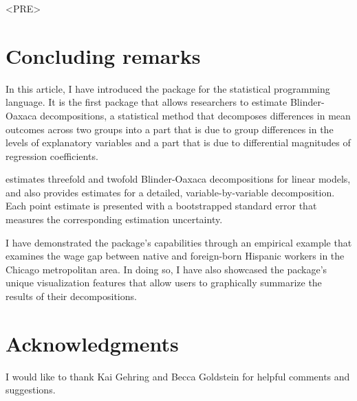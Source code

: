 <PRE>\documentclass[nojss]{jss}
\begin{document}
\section[Concluding remarks]{Concluding remarks}
\label{Section5}
In this article, I have introduced the  package for the  statistical programming language. It is the first  package that allows researchers to estimate Blinder-Oaxaca decompositions, a statistical method that decomposes differences in mean outcomes across two groups into a part that is due to group differences in the levels of explanatory variables and a part that is due to differential magnitudes of regression coefficients.

 estimates threefold and twofold Blinder-Oaxaca decompositions for linear models, and also provides estimates for a detailed, variable-by-variable decomposition. Each point estimate is presented with a bootstrapped standard error that measures the corresponding estimation uncertainty.

I have demonstrated the package's capabilities through an empirical example that examines the wage gap between native and foreign-born Hispanic workers in the Chicago metropolitan area. In doing so, I have also showcased the  package's unique visualization features that allow users to graphically summarize the results of their decompositions.

\section*{Acknowledgments}
I would like to thank Kai Gehring and Becca Goldstein for helpful comments and suggestions.


\end{document}
